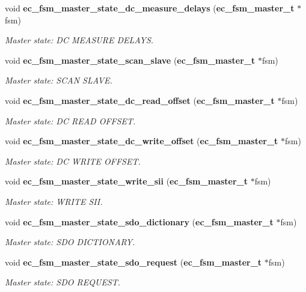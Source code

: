 \begin{DoxyCompactItemize}
void {\bf ec\-\_\-fsm\-\_\-master\-\_\-state\-\_\-dc\-\_\-measure\-\_\-delays} ({\bf ec\-\_\-fsm\-\_\-master\-\_\-t} $\ast$fsm)
\begin{DoxyCompactList}\small\item\em Master state\-: D\-C M\-E\-A\-S\-U\-R\-E D\-E\-L\-A\-Y\-S. \end{DoxyCompactList}\item 
void {\bf ec\-\_\-fsm\-\_\-master\-\_\-state\-\_\-scan\-\_\-slave} ({\bf ec\-\_\-fsm\-\_\-master\-\_\-t} $\ast$fsm)
\begin{DoxyCompactList}\small\item\em Master state\-: S\-C\-A\-N S\-L\-A\-V\-E. \end{DoxyCompactList}\item 
void {\bf ec\-\_\-fsm\-\_\-master\-\_\-state\-\_\-dc\-\_\-read\-\_\-offset} ({\bf ec\-\_\-fsm\-\_\-master\-\_\-t} $\ast$fsm)
\begin{DoxyCompactList}\small\item\em Master state\-: D\-C R\-E\-A\-D O\-F\-F\-S\-E\-T. \end{DoxyCompactList}\item 
void {\bf ec\-\_\-fsm\-\_\-master\-\_\-state\-\_\-dc\-\_\-write\-\_\-offset} ({\bf ec\-\_\-fsm\-\_\-master\-\_\-t} $\ast$fsm)
\begin{DoxyCompactList}\small\item\em Master state\-: D\-C W\-R\-I\-T\-E O\-F\-F\-S\-E\-T. \end{DoxyCompactList}\item 
void {\bf ec\-\_\-fsm\-\_\-master\-\_\-state\-\_\-write\-\_\-sii} ({\bf ec\-\_\-fsm\-\_\-master\-\_\-t} $\ast$fsm)
\begin{DoxyCompactList}\small\item\em Master state\-: W\-R\-I\-T\-E S\-I\-I. \end{DoxyCompactList}\item 
void {\bf ec\-\_\-fsm\-\_\-master\-\_\-state\-\_\-sdo\-\_\-dictionary} ({\bf ec\-\_\-fsm\-\_\-master\-\_\-t} $\ast$fsm)
\begin{DoxyCompactList}\small\item\em Master state\-: S\-D\-O D\-I\-C\-T\-I\-O\-N\-A\-R\-Y. \end{DoxyCompactList}\item 
void {\bf ec\-\_\-fsm\-\_\-master\-\_\-state\-\_\-sdo\-\_\-request} ({\bf ec\-\_\-fsm\-\_\-master\-\_\-t} $\ast$fsm)
\begin{DoxyCompactList}\small\item\em Master state\-: S\-D\-O R\-E\-Q\-U\-E\-S\-T. \end{DoxyCompactList}\item 

\end{DoxyCompactItemize}
